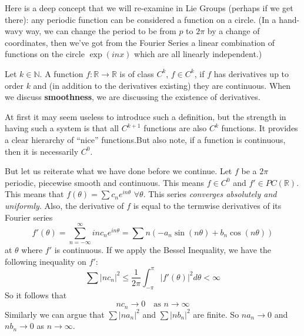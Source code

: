 
Here is a deep concept that we will re-examine in Lie Groups
(perhaps if we get there): any periodic function can be
considered a function on a circle. (In a hand-wavy way, we
can change the period to be from $p$ to $2\pi$ by a change
of coordinates, then we've got from the Fourier Series a
linear combination of functions on the circle $\exp(inx)$
which are all linearly independent.)
\begin{defn}
Let $k\in\mathbb{N}$. A function $f:\mathbb{R}\to\mathbb{R}$
is of class $C^k$, $f\in C^k$, if $f$ has derivatives up to
order $k$ and (in addition to the derivatives existing) they
are continuous. When we discuss \textbf{smoothness}, we are
discussing the existence of derivatives.
\end{defn}
At first it may seem useless to introduce such a definition,
but the strength in having such a system is that all
$C^{k+1}$ functions are also $C^{k}$ functions. It provides
a clear hierarchy of ``nice'' functions.But also note, if a function is
continuous, then it is necessarily $C^0$. 

But let us reiterate what we have done before we
continue. Let $f$ be a $2\pi$ periodic, piecewise smooth and
continuous. This means $f\in C^0$ and $f'\in
PC(\mathbb{R})$. This means that $f(\theta)=\sum
c_{n}e^{in\theta}$ $\forall \theta$. This series \emph{converges
absolutely and uniformly}. Also, the derivative of $f$ is
equal to the termwise derivatives of its Fourier series
\begin{equation}
f'(\theta) = \sum^{\infty}_{n=-\infty}inc_{n}e^{in\theta} =
\sum n(-a_{n}\sin(n\theta)+b_{n}\cos(n\theta))
\end{equation}
at $\theta$ where $f'$ is continuous. If we apply the Bessel
Inequality, we have the following inequality on $f'$:
\begin{equation}
\sum
|nc_{n}|^{2}\leq\frac{1}{2\pi}\int^{\pi}_{-\pi}|f'(\theta)|^{2}d\theta
< \infty
\end{equation}
So it follows that
\begin{equation}
nc_{n}\to 0\quad\text{as }n\to\infty
\end{equation}
Similarly we can argue that $\sum|na_{n}|^{2}$ and $\sum
|nb_{n}|^{2}$ are finite. So $na_{n}\to 0$ and $nb_{n}\to 0$
as $n\to\infty$.

